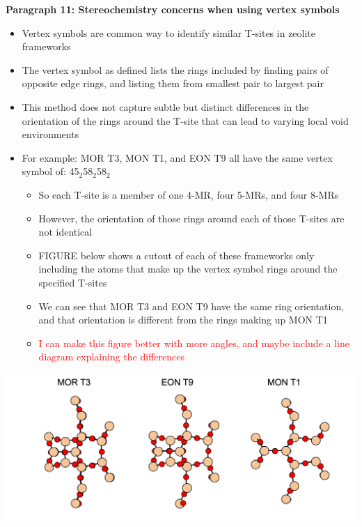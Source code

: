 \documentclass[11pt]{article}
\newcommand{\red}[1]{\textcolor{red}{#1}}
\begin{document}
\textbf{\textbf{Paragraph 11: Stereochemistry concerns when using vertex symbols}}
\begin{itemize}
\item Vertex symbols are common way to identify similar T-sites in zeolite frameworks
\item The vertex symbol as defined lists the rings included by finding pairs of opposite edge rings, and listing them from smallest pair to largest pair
\item This method does not capture subtle but distinct differences in the orientation of the rings around the T-site that can lead to varying local void environments
\item For example: MOR T3, MON T1, and EON T9 all have the same vertex symbol of: 4\textbullet{}5\(_{\text{2}}\)\textbullet{}5\textbullet{}8\(_{\text{2}}\)\textbullet{}5\textbullet{}8\(_{\text{2}}\)
\begin{itemize}
\item So each T-site is a member of one 4-MR, four 5-MRs, and four 8-MRs
\item However, the orientation of those rings around each of those T-sites are not identical
\item FIGURE below shows a cutout of each of these frameworks only including the atoms that make up the vertex symbol rings around the specified T-sites
\item We can see that MOR T3 and EON T9 have the same ring orientation, and that orientation is different from the rings making up MON T1
\item \red{I can make this figure better with more angles, and maybe include a line diagram explaining the differences}
\end{itemize}
\end{itemize}

\begin{center}
\includegraphics[width=.6\textwidth]{../figures/completed-figures/stereo.png}
\end{center}
\end{document}
